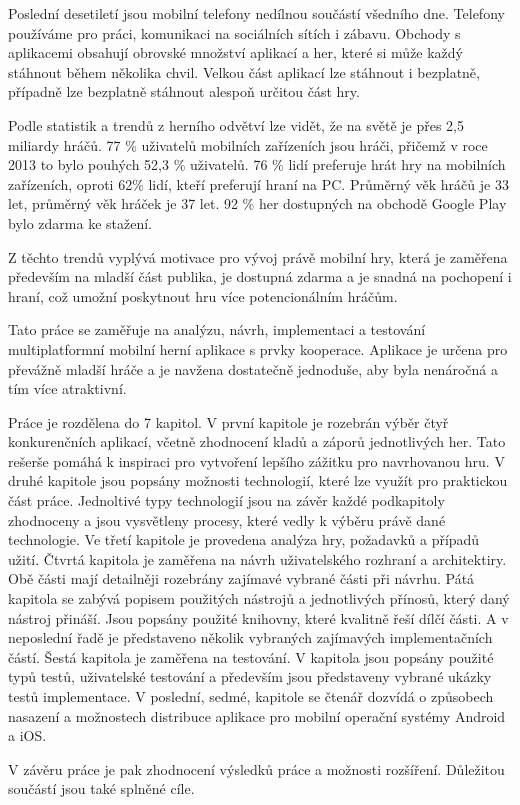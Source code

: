 \begin{introduction}
Poslední desetiletí jsou mobilní telefony nedílnou součástí všedního dne.
Telefony používáme pro práci, komunikaci na sociálních sítích i zábavu.
Obchody s aplikacemi obsahují obrovské množství aplikací a her,
které si může každý stáhnout během několika chvil.
Velkou část aplikací lze stáhnout i bezplatně,
případně lze bezplatně stáhnout alespoň určitou část hry.

Podle statistik a trendů z herního odvětví \cite{wepc_video_game_statistics}
lze vidět,
že na světě je přes 2,5 miliardy hráčů.
77 \% uživatelů mobilních zařízeních jsou hráči,
přičemž v roce 2013 to bylo pouhých 52,3 \% uživatelů.
76 \% lidí preferuje hrát hry na mobilních zařízeních,
oproti 62\% lidí, kteří preferují hraní na PC.
Průměrný věk hráčů je 33 let, průměrný věk hráček je 37 let.
92 \% her dostupných na obchodě Google Play bylo zdarma ke stažení.

Z těchto trendů vyplývá motivace pro vývoj právě mobilní hry,
která je zaměřena především na mladší část publika,
je dostupná zdarma a je snadná na pochopení i hraní,
což umožní poskytnout hru více potencionálním hráčům.

Tato práce se zaměřuje na analýzu, návrh, implementaci a testování
multiplatformní mobilní herní aplikace s prvky kooperace.
Aplikace je určena pro převážně mladší hráče
a je navžena dostatečně jednoduše,
aby byla nenáročná a tím více atraktivní.

Práce je rozdělena do 7 kapitol.
V první kapitole je rozebrán výběr čtyř konkurenčních aplikací,
včetně zhodnocení kladů a záporů jednotlivých her.
Tato rešerše pomáhá k inspiraci pro vytvoření lepšího zážitku pro navrhovanou
hru.
V druhé kapitole jsou popsány možnosti technologií,
které lze využít pro praktickou část práce.
Jednoltivé typy technologií jsou na závěr každé podkapitoly zhodnoceny
a jsou vysvětleny procesy, které vedly k výběru právě dané technologie.
Ve třetí kapitole je provedena analýza hry, požadavků a případů užití.
Čtvrtá kapitola je zaměřena na návrh uživatelského rozhraní a architektiry.
Obě části mají detailněji rozebrány zajímavé vybrané části při návrhu.
Pátá kapitola se zabývá popisem použitých nástrojů
a jednotlivých přínosů, který daný nástroj přináší.
Jsou popsány použité knihovny, které kvalitně řeší dílčí části.
A v neposlední řadě je představeno několik vybraných zajímavých
implementačních částí.
Šestá kapitola je zaměřena na testování.
V kapitola jsou popsány použité typů testů,
uživatelské testování a především jsou představeny vybrané ukázky testů
implementace.
V poslední, sedmé, kapitole se čtenář dozvídá o způsobech nasazení a
možnostech distribuce aplikace pro mobilní operační systémy Android a iOS.

V závěru práce je pak zhodnocení výsledků práce a možnosti rozšíření.
Důležitou součástí jsou také splněné cíle.
\end{introduction}
